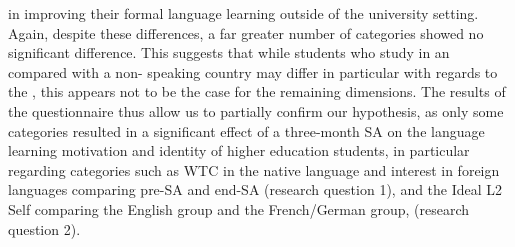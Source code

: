 \documentclass[output=paper]{langsci/langscibook}
\begin{document}
in improving their formal language learning outside of the university setting. Again, despite these differences, a far greater number of categories showed no significant difference. This suggests that while students who study in an  compared with a non- speaking country may differ in particular with regards to the , this appears not to be the case for the remaining dimensions. 
	The results of the questionnaire thus allow us to partially confirm our hypothesis, as only some categories resulted in a significant effect of a three-month SA on the language learning motivation and identity of higher education students, in particular regarding categories such as WTC in the native language and interest in foreign languages comparing pre-SA and end-SA (research question 1), and the Ideal L2 Self comparing the English group and the French/German group, (research question 2). 
\end{document}
